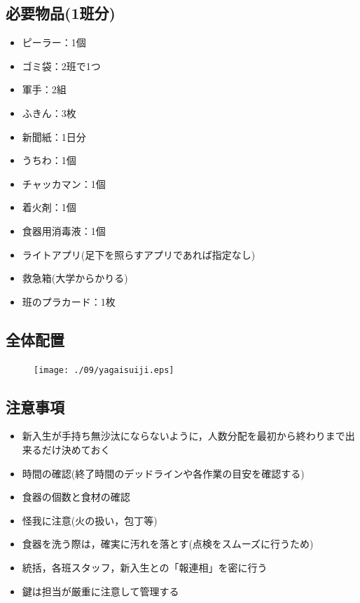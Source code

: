 \subsection{必要物品(1班分)}
\begin{itemize}
  \item ピーラー：1個
  \item ゴミ袋：2班で1つ
  \item 軍手：2組
  \item ふきん：3枚
  \item 新聞紙：1日分
  \item うちわ：1個
  \item チャッカマン：1個
  \item 着火剤：1個
  \item 食器用消毒液：1個
  \item ライトアプリ(足下を照らすアプリであれば指定なし)
  \item 救急箱(大学からかりる)
  \item 班のプラカード：1枚
\end{itemize}


\subsection{全体配置}
\begin{figure}[h]
\begin{center}
\texttt{[image: ./09/yagaisuiji.eps]}
\end{center}
\end{figure}


\subsection{注意事項}
\begin{itemize}
  \item 新入生が手持ち無沙汰にならないように，人数分配を最初から終わりまで出来るだけ決めておく
  \item 時間の確認(終了時間のデッドラインや各作業の目安を確認する)
  \item 食器の個数と食材の確認
  \item 怪我に注意(火の扱い，包丁等)
  \item 食器を洗う際は，確実に汚れを落とす(点検をスムーズに行うため)
  \item 統括，各班スタッフ，新入生との「報連相」を密に行う
  \item 鍵は担当が厳重に注意して管理する
\end{itemize}

